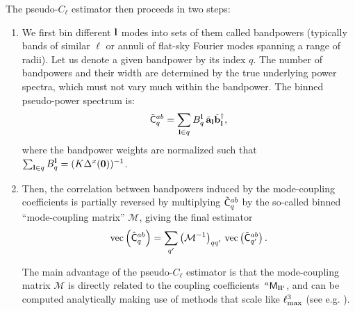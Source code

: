 \documentclass[a4paper,11pt]{article}
\newcommand{\cgg}[1]{{\color{olive} #1}}
\begin{document}
      The pseudo-$C_\ell$ estimator then proceeds in two steps:
      \begin{enumerate}
        \item We first bin different ${\bf l}$ modes into sets of them called
          bandpowers (typically bands of similar $\ell$ or annuli of flat-sky
          Fourier modes spanning a range of radii). Let us denote a given
          bandpower by its index $q$. \cgg{The number of bandpowers and their
            width are determined by the true underlying power spectra, which
            must not vary much within the bandpower}. The binned pseudo-power spectrum is:
        \begin{equation}\label{eq:bandpowers}
          \tilde{\sf C}^{ab}_q=\sum_{{\bf l}\in q} B_q^{\bf l}\,\tilde{\bf a}_{\bf l}\tilde{\bf b}^\dag_{\bf l},
        \end{equation}
        where the bandpower weights are normalized such that $\sum_{{\bf l}\in
          q}B_q^{\bf l}=(K\Delta^x({\bf 0}))^{-1}$.
        \item Then, the correlation between bandpowers induced by the mode-coupling coefficients is partially reversed by multiplying $\tilde{\sf C}^{ab}_q$ by the so-called binned ``mode-coupling matrix'' $\mathcal{M}$, giving the final estimator
        \begin{equation}
          {\rm vec}\left(\hat{\sf C}^{ab}_q\right) = \sum_{q'} \left(\mathcal{M}^{-1}\right)_{qq'}\,{\rm vec}\left(\tilde{\sf C}^{ab}_{q'}\right).
        \end{equation}

        The main advantage of the pseudo-$C_\ell$ estimator is that the mode-coupling matrix $\mathcal{M}$ is directly related to the coupling coefficients $\,^a{\sf M}_{{\bf l}{\bf l}'}$, and can be computed analytically making use of methods that scale like $\ell_{\rm max}^3$ (see e.g. \cite{2002ApJ...567....2H}).
      \end{enumerate}
    
\end{document}
